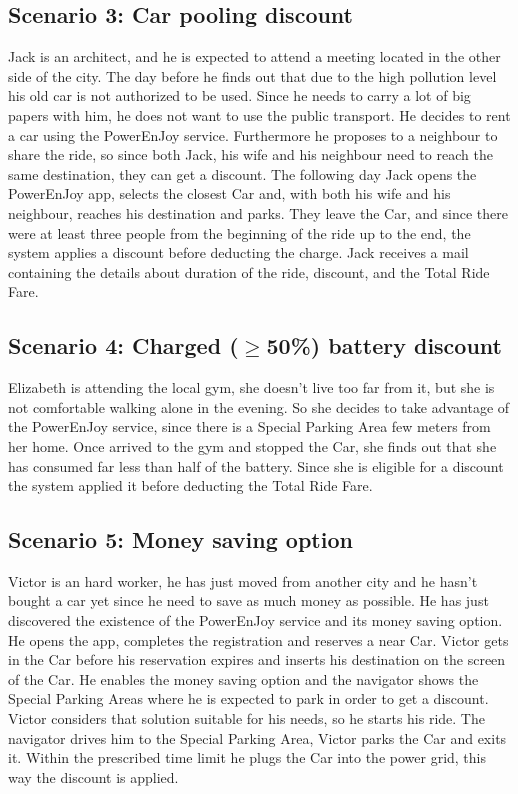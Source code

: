 \subsection{Scenario 3: Car pooling discount}
Jack is an architect, and he is expected to attend a meeting located in the other side of the city. The day before he finds out that due to the high pollution level his old car is not authorized to be used. Since he needs to carry a lot of big papers with him, he does not want to use the public transport. He decides to rent a car using the PowerEnJoy service. Furthermore he proposes to a neighbour to share the ride, so since both Jack, his wife and his neighbour need to reach the same destination, they can get a discount. The following day Jack opens the PowerEnJoy app, selects the closest Car and, with both his wife and his neighbour, reaches his destination and parks. They leave the Car, and since there were at least three people from the beginning of the ride up to the end, the system applies a discount before deducting the charge. Jack receives a mail containing the details about duration of the ride, discount, and the Total Ride Fare.

\subsection{Scenario 4: Charged ($\geq$50\%) battery discount}
Elizabeth is attending the local gym, she doesn't live too far from it, but she is not comfortable walking alone in the evening. So she decides to take advantage of the PowerEnJoy service, since there is a Special Parking Area few meters from her home. Once arrived to the gym and stopped the Car, she finds out that she has consumed far less than half of the battery. Since she is eligible for a discount the system applied it before deducting the Total Ride Fare.

\subsection{Scenario 5: Money saving option}
Victor is an hard worker, he has just moved from another city and he hasn't bought a car yet since he need to save as much money as possible. He has just discovered the existence of the PowerEnJoy service and its money saving option. He opens the app, completes the registration and reserves a near Car. Victor gets in the Car before his reservation expires and inserts his destination on the screen of the Car. He enables the money saving option and the navigator shows the Special Parking Areas where he is expected to park in order to get a discount. Victor considers that solution suitable for his needs, so he starts his ride. The navigator drives him to the Special Parking Area, Victor parks the Car and exits it. Within the prescribed time limit he plugs the Car into the power grid, this way the discount is applied.

